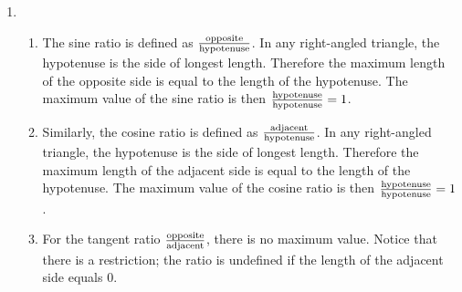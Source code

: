 \begin{solutions}{}
{\begin{enumerate}[itemsep=7pt, label=\textbf{\arabic*}. ]
\begin{multicols}{2}
\end{multicols}
\item %
\begin{enumerate}[noitemsep, label=\textbf{(\alph*)} ]
 \item  The sine ratio is defined as $$.  In any right-angled triangle, the hypotenuse is the side of longest length.  Therefore the maximum length of the opposite side is equal to the length of the hypotenuse.  The maximum value of the sine ratio is then $=1$.
 \item Similarly, the cosine ratio is defined as $$.  In any right-angled triangle, the hypotenuse is the side of longest length.  Therefore the maximum length of the adjacent side is equal to the length of the hypotenuse.  The maximum value of the cosine ratio is then $=1$.
 \item For the tangent ratio $$, there is no maximum value. Notice that there is a restriction; the ratio is undefined if the length of the adjacent side equals $0$.



 \end{enumerate}
\end{enumerate}}
\end{solutions}

